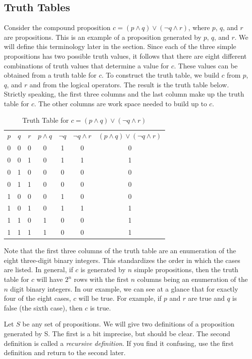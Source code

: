 \documentclass[10pt,]{book}
\theoremstyle{plain}
\theoremstyle{definition}
\theoremstyle{definition}
\theoremstyle{definition}
\theoremstyle{definition}
\begin{document}
\subsection[Truth Tables]{Truth Tables}\label{truth-tables}
Consider the compound proposition \(c= (p \land  q)\lor  (\neg q \land  r)\), where \(p\), \(q\), and \(r\) are propositions. This is an example of a proposition generated by \(p\), \(q\), and \(r\). We will define this terminology later in the section. Since each of the three simple propositions has two possible truth values, it follows that there are eight different combinations of truth values that determine a value for \(c\). These values can be obtained from a truth table for \(c\). To construct the truth table, we build \(c\) from \(p\), \(q\), and \(r\) and from the logical operators. The result is the truth table below. Strictly speaking, the first three columns and the last column make up the truth table for \(c\). The other columns are work space needed to build up to \(c\).%
\leavevmode%
\begin{table}
\centering
\begin{tabular}{ccccccc}
\(p\)&\(q\)&\(r\)&\(p\land q\)&\(\neg q\)&\(\neg q\land r\)&\((p\land q)\lor (\neg q\land r)\)\tabularnewline[0pt]
0&0&0&0&1&0&0\tabularnewline[0pt]
0&0&1&0&1&1&1\tabularnewline[0pt]
0&1&0&0&0&0&0\tabularnewline[0pt]
0&1&1&0&0&0&0\tabularnewline[0pt]
1&0&0&0&1&0&0\tabularnewline[0pt]
1&0&1&0&1&1&1\tabularnewline[0pt]
1&1&0&1&0&0&1\tabularnewline[0pt]
1&1&1&1&0&0&1
\end{tabular}
\caption{Truth Table for \(c= (p \land  q)\lor  (\neg q \land  r)\)\label{tt32-1}}
\end{table}
\par
Note that the first three columns of the truth table are an enumeration of the eight three-digit binary integers. This standardizes the order in
which the cases are listed. In general, if \( c\) is generated by \(n\) simple propositions, then the truth table for \(c\) will
have \(2^n\) rows with the first \(n\) columns being an enumeration of the \(n\) digit binary integers. In our example, we can see at
a glance that for exactly four of the eight cases, \(c\) will be true. For example, if \(p\) and \(r\) are true and \(q\)
is false (the sixth case), then \(c\) is true.%
\par
Let \(S\) be any set of propositions. We will give two definitions of a proposition generated by S. The first is a bit imprecise,
but should be clear. The second definition is called a \emph{recursive definition}. If you find it confusing, use the first definition and return
to the second later.%
\typeout{************************************************}
\typeout{************************************************}
\end{document}
